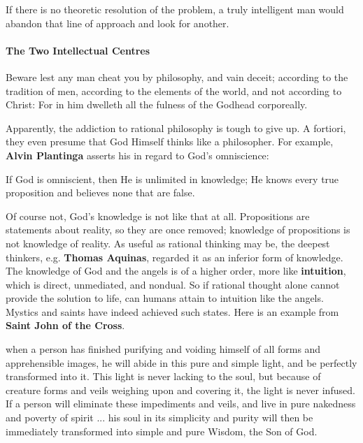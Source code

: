 If there is no theoretic resolution of the problem, a truly intelligent man would abandon that line of approach and look for another.

\paragraph{The Two Intellectual Centres}


\begin{quotex}
Beware lest any man cheat you by philosophy, and vain deceit; according to the tradition of men, according to the elements of the world, and not according to Christ: For in him dwelleth all the fulness of the Godhead corporeally.
\end{quotex}


Apparently, the addiction to rational philosophy is tough to give up. A fortiori, they even presume that God Himself thinks like a philosopher. For example, \textbf{Alvin Plantinga} asserts his in regard to God's omniscience:

\begin{quotex}
If God is omniscient, then He is unlimited in knowledge; He knows every true proposition and believes none that are false.
\end{quotex}


Of course not, God's knowledge is not like that at all. Propositions are statements about reality, so they are once removed; knowledge of propositions is not knowledge of reality. As useful as rational thinking may be, the deepest thinkers, e.g. \textbf{Thomas Aquinas}, regarded it as an inferior form of knowledge. The knowledge of God and the angels is of a higher order, more like \textbf{intuition}, which is direct, unmediated, and nondual. So if rational thought alone cannot provide the solution to life, can humans attain to intuition like the angels. Mystics and saints have indeed achieved such states. Here is an example from \textbf{Saint John of the Cross}.

\begin{quotex}
when a person has finished purifying and voiding himself of all forms and apprehensible images, he will abide in this pure and simple light, and be perfectly transformed into it. This light is never lacking to the soul, but because of creature forms and veils weighing upon and covering it, the light is never infused. If a person will eliminate these impediments and veils, and live in pure nakedness and poverty of spirit ... his soul in its simplicity and purity will then be immediately transformed into simple and pure Wisdom, the Son of God.
\end{quotex}


